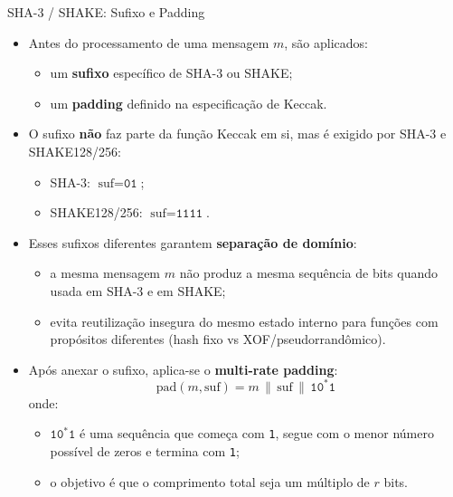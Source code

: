 \documentclass{beamer}
\begin{document}
\begin{frame}{SHA-3 / SHAKE: Sufixo e Padding}
  \begin{itemize}
    \item Antes do processamento de uma mensagem $m$, são aplicados:
      \begin{itemize}
        \item um \textbf{sufixo} específico de SHA-3 ou SHAKE;
        \item um \textbf{padding} definido na especificação de Keccak.
      \end{itemize}
    \item O sufixo \textbf{não} faz parte da função Keccak em si, mas é exigido por SHA-3 e SHAKE128/256:
      \begin{itemize}
        \item SHA-3: \quad $\text{suf} = \texttt{01}$;
        \item SHAKE128/256: \quad $\text{suf} = \texttt{1111}$.
      \end{itemize}
    \item Esses sufixos diferentes garantem \textbf{separação de domínio}:
      \begin{itemize}
        \item a mesma mensagem $m$ não produz a mesma sequência de bits
              quando usada em SHA-3 e em SHAKE;
        \item evita reutilização insegura do mesmo estado interno para funções com propósitos diferentes
              (hash fixo vs XOF/pseudorrandômico).
      \end{itemize}
    \item Após anexar o sufixo, aplica-se o \textbf{multi-rate padding}:
      \[
        \text{pad}(m,\text{suf}) = m \,\|\, \text{suf} \,\|\, \texttt{10}^*\texttt{1}
      \]
        onde:
        \begin{itemize}
        \item $\texttt{10}^*\texttt{1}$ é uma sequência que começa com \texttt{1},
              segue com o menor número possível de zeros e termina com \texttt{1};
        \item o objetivo é que o comprimento total seja um múltiplo de $r$ bits.
      \end{itemize}
  \end{itemize}
\end{frame}
\end{document}
